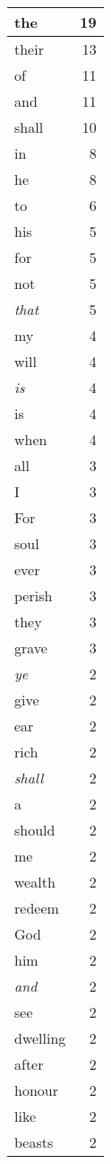 \begin{center}
\begin{longtable}{l|r}
\hline \hline
\endlastfoot
the & 19 \\ \hline
their & 13 \\ \hline
of & 11 \\ \hline
and & 11 \\ \hline
shall & 10 \\ \hline
in & 8 \\ \hline
he & 8 \\ \hline
to & 6 \\ \hline
his & 5 \\ \hline
for & 5 \\ \hline
not & 5 \\ \hline
\emph{that} & 5 \\ \hline
my & 4 \\ \hline
will & 4 \\ \hline
\emph{is} & 4 \\ \hline
is & 4 \\ \hline
when & 4 \\ \hline
all & 3 \\ \hline
I & 3 \\ \hline
For & 3 \\ \hline
soul & 3 \\ \hline
ever & 3 \\ \hline
perish & 3 \\ \hline
they & 3 \\ \hline
grave & 3 \\ \hline
\emph{ye} & 2 \\ \hline
give & 2 \\ \hline
ear & 2 \\ \hline
rich & 2 \\ \hline
\emph{shall} & 2 \\ \hline
a & 2 \\ \hline
should & 2 \\ \hline
me & 2 \\ \hline
wealth & 2 \\ \hline
redeem & 2 \\ \hline
God & 2 \\ \hline
him & 2 \\ \hline
\emph{and} & 2 \\ \hline
see & 2 \\ \hline
dwelling & 2 \\ \hline
after & 2 \\ \hline
honour & 2 \\ \hline
like & 2 \\ \hline
beasts & 2 \\ \hline

\end{longtable}
\end{center}
